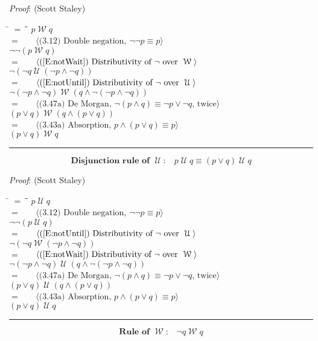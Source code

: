 \documentclass[12pt, fleqn, leqno]{article}
\newcommand{\lgap}{2pt}                             %
\newcommand{\mymathindent}{24pt}                    %
\newcommand{\Until}{\;\mathcal{U}\;}
\newcommand{\Wait}{\;\mathcal{W}\;}
\newcommand{\myqed}{\rule[-.23ex]{1.2ex}{2.0ex}}
\newcommand{\myqedtab}{\hspace{384pt}}              %
\newcommand{\Gll} {\langle}                         %
\newcommand{\Ggg} {\rangle}                         %
\newcommand{\Hint}[1]     {\ \ \ $\Gll              \mbox{#1} \Ggg$ }   %
\begin{document}
\emph{Proof}: (Scott Staley)
\begin{tabbing}
\hspace{\mymathindent} \= $= \;$ \= \myqedtab \= \kill
\> \> $p\Wait q$\\[\lgap]
\> $=$ \> \Hint{(3.12) Double negation, $\neg\neg p\equiv p$} \\[\lgap]
\> \> $\neg\neg (p\Wait q)$\\[\lgap]
\> $=$ \> \Hint{(\ref{E:notWait}) Distributivity of $\neg$ over $\Wait$} \\[\lgap]
\> \> $\neg (\neg q\Until (\neg p\land \neg q))$\\[\lgap]
\> $=$ \> \Hint{(\ref{E:notUntil}) Distributivity of $\neg$ over $\Until$} \\[\lgap]
\> \> $\neg (\neg p\land \neg q)\Wait (q\land \neg (\neg p\land \neg q))$\\[\lgap]
\> $=$ \> \Hint{(3.47a) De Morgan, $\neg (p\land q)\equiv \neg p\lor \neg q$, twice} \\[\lgap]
\> \> $( p\lor q)\Wait (q\land (p\lor q))$\\[\lgap]
\> $=$ \> \Hint{(3.43a) Absorption, $p\land (p\lor q) \equiv p$} \\[\lgap]
\> \> $(p\lor q) \Wait q$ \quad \myqed
\end{tabbing}
\begin{equation}\label{E:disRuleUntil}
\textbf{Disjunction rule of $\Until$:}\quad p\Until q\equiv (p\lor q)\Until q
\end{equation}

\emph{Proof}: (Scott Staley)
\begin{tabbing}
\hspace{\mymathindent} \= $= \;$ \= \myqedtab \= \kill
\> \> $p\Until q$\\[\lgap]
\> $=$ \> \Hint{(3.12) Double negation, $\neg\neg p\equiv p$} \\[\lgap]
\> \> $\neg\neg (p\Until q)$\\[\lgap]
\> $=$ \> \Hint{(\ref{E:notUntil}) Distributivity of $\neg$ over $\Until$} \\[\lgap]
\> \> $\neg (\neg q\Wait (\neg p\land \neg q))$\\[\lgap]
\> $=$ \> \Hint{(\ref{E:notWait}) Distributivity of $\neg$ over $\Wait$} \\[\lgap]
\> \> $\neg (\neg p\land \neg q)\Until (q\land \neg (\neg p\land \neg q))$\\[\lgap]
\> $=$ \> \Hint{(3.47a) De Morgan, $\neg (p\land q)\equiv \neg p\lor \neg q$, twice} \\[\lgap]
\> \> $( p\lor q)\Until (q\land (p\lor q))$\\[\lgap]
\> $=$ \> \Hint{(3.43a) Absorption, $p\land (p\lor q) \equiv p$} \\[\lgap]
\> \> $(p\lor q) \Until q$ \quad \myqed
\end{tabbing}
\begin{equation}\label{E:ruleWait}
\textbf{Rule of $\Wait$:}\quad \neg q \Wait q
\end{equation}
\end{document}
